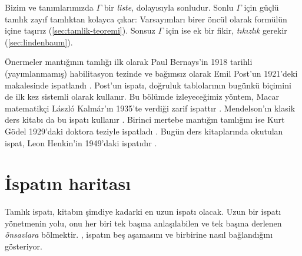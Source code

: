 \noindent Bizim  ve  tanımlarımızda $\Gamma$ bir
\emph{liste}, dolayısıyla sonludur. Sonlu $\Gamma$ için güçlü tamlık
zayıf tamlıktan kolayca çıkar: Varsayımları birer öncül olarak formülün
içine taşırız (\cref{sec:tamlik-teoremi}). Sonsuz $\Gamma$ için ise ek
bir fikir, \emph{tıkızlık} gerekir (\cref{sec:lindenbaum}).

\begin{tarihce}
Önermeler mantığının tamlığı ilk olarak Paul Bernays'in 1918 tarihli
(yayımlanmamış) habilitasyon tezinde ve bağımsız olarak Emil Post'un
1921'deki makalesinde ispatlandı \citep{post1921}. Post'un ispatı,
doğruluk tablolarının bugünkü biçimini de ilk kez sistemli olarak
kullanır. Bu bölümde izleyeceğimiz yöntem, Macar matematikçi László
Kalmár'ın 1935'te verdiği zarif ispattır \citep{kalmar1935}. Mendelson'ın
klasik ders kitabı da bu ispatı kullanır \citep{mendelson2015}. Birinci
mertebe mantığın tamlığını ise Kurt Gödel 1929'daki doktora teziyle
ispatladı \citep{godel1930}. Bugün ders kitaplarında okutulan ispat, Leon
Henkin'in 1949'daki ispatıdır \citep{henkin1949}.
\end{tarihce}

\section{İspatın haritası}\label{sec:tamlik-harita}

Tamlık ispatı, kitabın şimdiye kadarki en uzun \Lean{} ispatı olacak.
Uzun bir ispatı yönetmenin yolu, onu her biri tek başına anlaşılabilen ve
tek başına derlenen \emph{önsavlara} bölmektir.
, ispatın beş aşamasını ve birbirine nasıl
bağlandığını gösteriyor.

